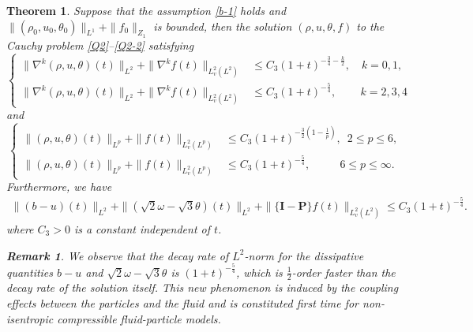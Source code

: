 \documentclass[reqno,11pt]{amsart}
\theoremstyle{plain}
\newtheorem{thm}{Theorem}[section]
\newtheorem{rem}{Remark}[section]
\numberwithin{equation}{section}
\begin{document}
\begin{thm}\label{T1.4}
 Suppose that the assumption
\eqref{b-1} holds and $\|(\rho_0,u_0,\theta_0)\|_{L^1}+\|f_0\|_{ {Z}_1}$ is bounded, then
the solution $(\rho,u,\theta,f)$ to the Cauchy problem \eqref{Q2}--\eqref{Q2-2} satisfying
 \begin{equation}\label{d1} 
\left\{
\begin{aligned}
 \|\nabla^k(\rho, u, \theta)(t)\|_{L^2 } +\|\nabla^kf(t)\|_{{L_v^2(L^{2})}}
&\leq C_3(1+t)^{-\frac{3}{4}-\frac{k}{2}},\quad k=0,1, \\
\|\nabla^k(\rho, u, \theta)(t)\|_{L^2 } +\|\nabla^kf(t)\|_{{L_v^2(L^{2})}}
&\leq C_3(1+t)^{-\frac{5}{4}},\quad\,\,\,\,\,\,\, k=2,3,4
\end{aligned}
\right.
\end{equation}
and
 \begin{equation} \label{d2}
\left\{
\begin{aligned}
\| (\rho, u, \theta)(t)\|_{L^p}+\|  f(t)\|_{L_v^2(L^p)}
 &\leq C_3(1+t)^{-\frac{3}{2}(1-\frac{1}{p})},\,\,\, 2\leq p\leq 6, \\  
\| (\rho, u, \theta)(t)\|_{L^p}+\|  f(t)\|_{L_v^2(L^p)}
 &\leq C_3(1+t)^{-\frac{5}{4} },\,\,\,\quad\quad\,  6\leq p\leq \infty. 
\end{aligned}
\right.
\end{equation}
Furthermore, we have 
\begin{align}\label{NJKd3}
 \|  (b-u)(t)\|_{L^2}+\|  (\sqrt{2}\omega-\sqrt{3}\theta)(t)\|_{L^2}
 +\|  \{\mathbf{I}-\mathbf{P}\}f(t)\|_{L_v^2(L^2)}  \leq C_3(1+t)^{-\frac{5}{4} }.
\end{align}
where    $C_3>0$ is a constant independent of    $t$. 

\begin{rem}
 We observe that the decay rate of   $L^2$-norm for the dissipative 
 quantities $ b - u $ and $ \sqrt{2}\omega - \sqrt{3}\theta $ is
  $ (1 + t)^{-\frac{5}{4}} $, which is  $\frac{1}{2}$-order faster 
  than the decay rate of the solution itself. This  new phenomenon is induced by the coupling effects between 
 the particles and the fluid and is constituted   first time for non-isentropic compressible fluid-particle models. 
\end{rem} 
 

\end{thm}
\end{document}
